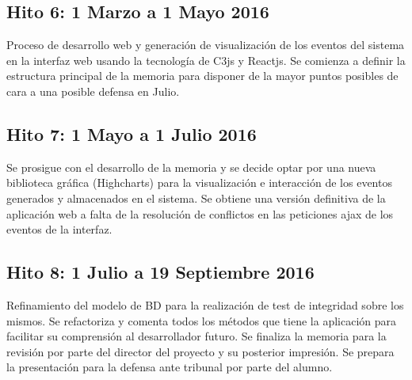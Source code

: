 \subsection{Hito 6: 1 Marzo a 1 Mayo 2016}
\label{subsec:hito6}

Proceso de desarrollo web y generación de visualización de los eventos del sistema en la interfaz web usando la tecnología de C3js y Reactjs. Se comienza a definir la estructura principal de la memoria para disponer de la mayor puntos posibles de cara a una posible defensa en Julio.
\newpage
\begin{minipage}{\linewidth}
  \subsection{Hito 7: 1 Mayo a 1 Julio 2016}
  \label{subsec:hito7}

  Se prosigue con el desarrollo de la memoria y se decide optar por una nueva biblioteca gráfica (Highcharts) para la visualización e interacción de los eventos generados y almacenados en el sistema. Se obtiene una versión definitiva de la aplicación web a falta de la resolución de conflictos en las peticiones ajax de los eventos de la interfaz.

  \subsection{Hito 8: 1 Julio a 19 Septiembre 2016}
  \label{subsec:hito8}

  Refinamiento del modelo de BD para la realización de test de integridad sobre los mismos. Se refactoriza y comenta todos los métodos que tiene la aplicación para facilitar su comprensión al desarrollador futuro. Se finaliza la memoria para la revisión por parte del director del proyecto y su posterior impresión. Se prepara la presentación para la defensa ante tribunal por parte del alumno.
\end{minipage}

